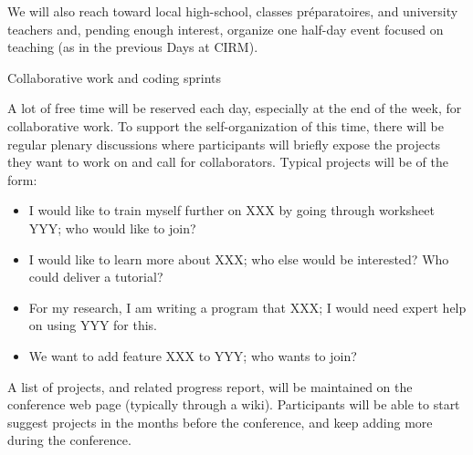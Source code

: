 \documentclass[12pt]{amsart}
\makeatletter
\def\subsection{\@startsection{subsection}{2}%
  \z@{.3\linespacing\@plus.5\linespacing}{.1\linespacing}%
  {\normalfont\bfseries}}
\makeatother
\begin{document}
We will also reach toward local high-school, classes préparatoires,
and university teachers and, pending enough interest, organize one
half-day event focused on teaching (as in the previous \Sage Days at
CIRM).

\subsection{Collaborative work and coding sprints}

A lot of free time will be reserved each day, especially at the end of
the week, for collaborative work. To support the self-organization of
this time, there will be regular plenary discussions where
participants will briefly expose the projects they want to work on and
call for collaborators. Typical projects will be of the form:
\begin{itemize}
\item I would like to train myself further on XXX by going through
  worksheet YYY; who would like to join?
\item I would like to learn more about XXX; who else would be
  interested? Who could deliver a tutorial?
\item For my research, I am writing a program that XXX; I would need
  expert help on using YYY for this.
\item We want to add feature XXX to YYY; who wants to join?
\end{itemize}

A list of projects, and related progress report, will be maintained on
the conference web page (typically through a wiki). Participants will
be able to start suggest projects in the months before the conference,
and keep adding more during the conference.
\end{document}
